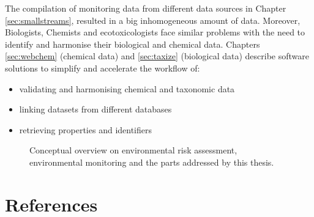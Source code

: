 \noindent
The compilation of monitoring data from different data sources in Chapter \ref{sec:smallstreams}, resulted in a big inhomogeneous amount of data.
Moreover, Biologists, Chemists and ecotoxicologists face similar problems with the need to identify and harmonise their biological and chemical data.
Chapters \ref{sec:webchem} (chemical data) and \ref{sec:taxize} (biological data) describe software solutions to simplify and accelerate the workflow of:

\begin{itemize}
	\item validating and harmonising chemical and taxonomic data
	\item linking datasets from different databases
	\item retrieving properties and identifiers
\end{itemize}



\begin{figure}[h]
	\vspace{2em}
    \hspace*{-1cm} 
	\resizebox{1.05\textwidth}{!}{%
		
	}
	\caption[Conceptual overview of the topics addressed by this thesis]{Conceptual overview on environmental risk assessment, environmental monitoring and the parts addressed by this thesis.}
	\label{fig:intro:overview}
\end{figure}



\clearpage
\section{References}
\printbibliography[heading=none]

